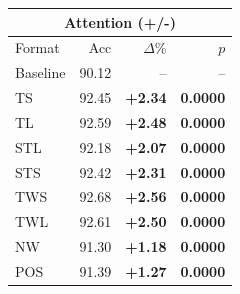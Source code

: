 \begin{tabular}{lrrr}
\toprule
\multicolumn{4}{c}{\textbf{Attention (+/-)}} \\
\midrule
Format & Acc & $\Delta$\% & $p$ \\
\midrule
Baseline & 90.12 & -- & -- \\
\midrule
TS & 92.45 & \textbf{+2.34} & \textbf{0.0000} \\
TL & 92.59 & \textbf{+2.48} & \textbf{0.0000} \\
STL & 92.18 & \textbf{+2.07} & \textbf{0.0000} \\
STS & 92.42 & \textbf{+2.31} & \textbf{0.0000} \\
TWS & 92.68 & \textbf{+2.56} & \textbf{0.0000} \\
TWL & 92.61 & \textbf{+2.50} & \textbf{0.0000} \\
NW & 91.30 & \textbf{+1.18} & \textbf{0.0000} \\
POS & 91.39 & \textbf{+1.27} & \textbf{0.0000} \\
\bottomrule
\end{tabular}